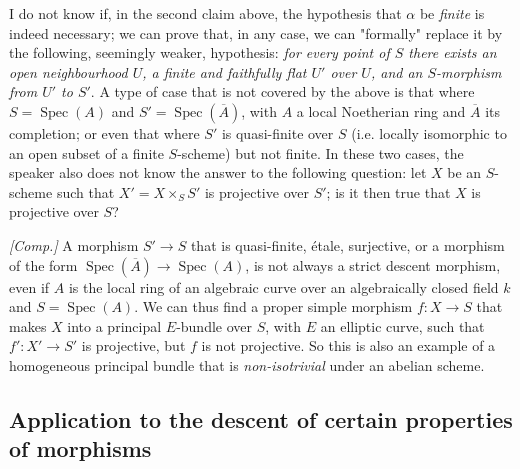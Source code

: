 \begin{remark}\label{fga3.i-b.1-remark}
    I do not know if, in the second claim above, the hypothesis that $\alpha$ be \emph{finite} is indeed necessary;
    we can prove that, in any case, we can "formally" replace it by the following, seemingly weaker, hypothesis:
    \emph{for every point of $S$ there exists an open neighbourhood $U$, a finite and faithfully flat $U'$ over $U$, and an $S$-morphism from $U'$ to $S'$}.
    A type of case that is not covered by the above is that where $S=\operatorname{Spec}(A)$ and $S'=\operatorname{Spec}(\overline{A})$, with $A$ a local Noetherian ring and $\overline{A}$ its completion;
    or even that where $S'$ is quasi-finite over $S$ (i.e. locally isomorphic to an open subset of a finite $S$-scheme) but not finite.
    In these two cases, the speaker also does not know the answer to the following question:
    let $X$ be an $S$-scheme such that $X'=X\times_S S'$ is projective over $S'$;
    is it then true that $X$ is projective over $S$?


    \emph{[Comp.]}
    A morphism $S'\to S$ that is quasi-finite, étale, surjective, or a morphism of the form $\operatorname{Spec}(\overline{A})\to\operatorname{Spec}(A)$, is not always a strict descent morphism, even if $A$ is the local ring of an algebraic curve over an algebraically closed field $k$ and $S=\operatorname{Spec}(A)$.
    We can thus find a proper simple morphism $f\colon X\to S$ that makes $X$ into a principal $E$-bundle over $S$, with $E$ an elliptic curve, such that $f'\colon X'\to S'$ is projective, but $f$ is not projective.
    So this is also an example of a homogeneous principal bundle that is \emph{non-isotrivial} under an abelian scheme.
\end{remark}

\subsection{Application to the descent of certain properties of morphisms}\label{fga3.i-b.2}

